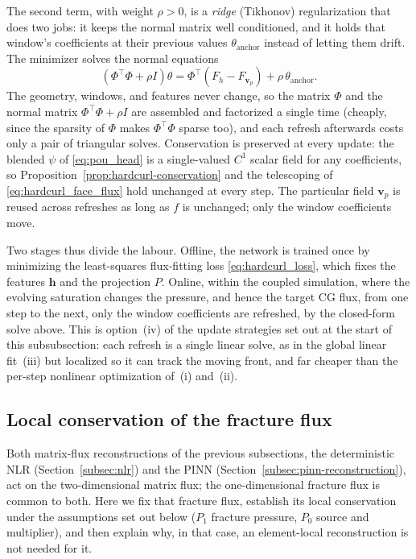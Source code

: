 \documentclass[a4paper,fleqn]{cas-sc}
\newcommand{\vflux}{\mathbf{v}}
\newcommand{\vp}{\vflux_{p}}              %
\begin{document}
The second term, with weight \(\rho>0\), is a \emph{ridge} (Tikhonov)
regularization that does two jobs: it keeps the normal matrix well conditioned,
and it holds that window's coefficients at their previous values
\(\theta_{\mathrm{anchor}}\) instead of letting them drift. The minimizer solves
the normal equations
\begin{equation}
  \left(\Phi^{\top}\Phi+\rho I\right)\theta
  =
  \Phi^{\top}\!\left(F_{h}-F_{\vp}\right)
  +\rho\,\theta_{\mathrm{anchor}} .
  \label{eq:pou_update}
\end{equation}
The geometry, windows, and features never change, so the matrix \(\Phi\) and the
normal matrix \(\Phi^{\top}\Phi+\rho I\) are assembled and factorized a single
time (cheaply, since the sparsity of \(\Phi\) makes \(\Phi^{\top}\Phi\) sparse
too), and each refresh afterwards costs only a pair of triangular solves. Conservation is preserved at every update: the blended
\(\psi\) of \eqref{eq:pou_head} is a single-valued \(C^1\) scalar field for any
coefficients, so Proposition~\ref{prop:hardcurl-conservation} and the
telescoping of \eqref{eq:hardcurl_face_flux} hold unchanged at every step. The
particular field \(\vp\) is reused across refreshes as long as \(f\) is
unchanged; only the window coefficients move.

Two stages thus divide the labour. Offline, the network is trained once by
minimizing the least-squares flux-fitting loss \eqref{eq:hardcurl_loss}, which
fixes the features \(\mathbf{h}\) and the projection \(P\). Online, within the coupled simulation,
where the evolving saturation changes the pressure, and hence the target CG
flux, from one step to the next, only the window coefficients are refreshed, by
the closed-form solve above. This is option~(iv) of the update strategies set
out at the start of this subsubsection: each refresh is a single linear solve,
as in the global linear fit~(iii) but localized so it can track the moving
front, and far cheaper than the per-step nonlinear optimization of~(i) and~(ii). 
\subsection{Local conservation of the fracture flux}
\label{subsec:fracture-flux}

Both matrix-flux reconstructions of the previous subsections, the deterministic
NLR (Section~\ref{subsec:nlr}) and the PINN
(Section~\ref{subsec:pinn-reconstruction}), act on the two-dimensional matrix
flux; the one-dimensional fracture flux is common to both. Here we fix that
fracture flux, establish its local conservation under the assumptions set out
below (\(P_1\) fracture pressure, \(P_0\) source and multiplier), and then
explain why, in that case, an element-local reconstruction is not needed for it.
\end{document}
